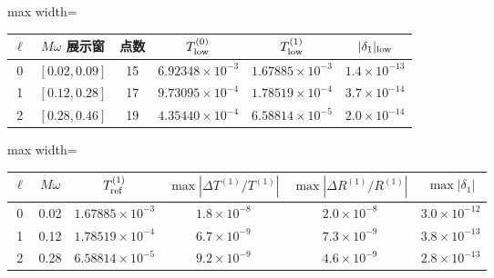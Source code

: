 \documentclass[UTF8,fontset=fandol,11pt,a4paper]{ctexart}
\begin{document}
\par\addvspace{12pt}\noindent\begin{minipage}{\linewidth}
\centering\fontsize{9.5}{12}\selectfont\setlength{\tabcolsep}{3pt}\renewcommand{\arraystretch}{1.18}
\label{audit:tab:low-acceptance}
\begin{adjustbox}{max width=\linewidth}
\begin{tabular}{c c c c c c}
\toprule
$\ell$ & $M\omega$ 展示窗 & 点数
& $T^{(0)}_{\rm low}$ & $T^{(1)}_{\rm low}$ & $|\delta_1|_{\rm low}$\\
\midrule
0 & $[0.02,0.09]$ & 15 & $6.92348\times10^{-3}$ & $1.67885\times10^{-3}$ & $1.4\times10^{-13}$\\
1 & $[0.12,0.28]$ & 17 & $9.73095\times10^{-4}$ & $1.78519\times10^{-4}$ & $3.7\times10^{-14}$\\
2 & $[0.28,0.46]$ & 19 & $4.35440\times10^{-4}$ & $6.58814\times10^{-5}$ & $2.0\times10^{-14}$\\
\bottomrule\end{tabular}\end{adjustbox}
\end{minipage}\par\addvspace{9pt}


\par\addvspace{12pt}\noindent\begin{minipage}{\linewidth}
\centering\fontsize{9.5}{12}\selectfont\setlength{\tabcolsep}{3pt}\renewcommand{\arraystretch}{1.18}
\label{audit:tab:low-convergence}
\begin{adjustbox}{max width=\linewidth}
\begin{tabular}{c c c c c c}
\toprule
$\ell$ & $M\omega$ & $T^{(1)}_{\rm ref}$
& $\max|\Delta T^{(1)}/T^{(1)}|$
& $\max|\Delta R^{(1)}/R^{(1)}|$ & $\max|\delta_1|$\\
\midrule
0 & 0.02 & $1.67885\times10^{-3}$ & $1.8\times10^{-8}$ & $2.0\times10^{-8}$ & $3.0\times10^{-12}$\\
1 & 0.12 & $1.78519\times10^{-4}$ & $6.7\times10^{-9}$ & $7.3\times10^{-9}$ & $3.8\times10^{-13}$\\
2 & 0.28 & $6.58814\times10^{-5}$ & $9.2\times10^{-9}$ & $4.6\times10^{-9}$ & $2.8\times10^{-13}$\\
\bottomrule\end{tabular}\end{adjustbox}
\end{minipage}\par\addvspace{9pt}
\end{document}
